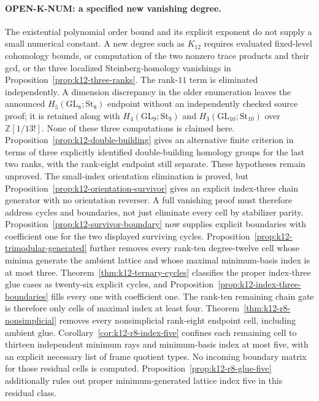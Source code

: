 \documentclass[11pt,a4paper]{article}
\theoremstyle{definition}
\begin{document}
\paragraph{OPEN-K-NUM: a specified new vanishing degree.}
The existential polynomial order bound and its explicit exponent do
not supply a small numerical constant. A new degree such as $K_{12}$
requires evaluated fixed-level cohomology bounds, or computation of the
two nonzero trace products and their gcd, or the three localized
Steinberg-homology vanishings in Proposition~\ref{prop:k12-three-ranks}.
The rank-$11$ term is eliminated independently. A dimension discrepancy
in the older enumeration leaves the announced $H_5(\mathrm{GL}_8;\mathrm{St}_8)$
endpoint without an independently checked source proof; it is retained
along with $H_4(\mathrm{GL}_9;\mathrm{St}_9)$ and
$H_3(\mathrm{GL}_{10};\mathrm{St}_{10})$ over $\mathbb Z[1/13!]$.
None of these three computations is claimed here.
Proposition~\ref{prop:k12-double-building} gives an alternative finite
criterion in terms of three explicitly identified double-building
homology groups for the last two ranks, with the rank-eight endpoint
still separate. These hypotheses remain unproved.
The small-index orientation elimination is proved, but
Proposition~\ref{prop:k12-orientation-survivor} gives an explicit
index-three chain generator with no orientation reverser. A full
vanishing proof must therefore address cycles and boundaries, not
just eliminate every cell by stabilizer parity.
Proposition~\ref{prop:k12-survivor-boundary} now supplies explicit
boundaries with coefficient one for the two displayed surviving
cycles. Proposition~\ref{prop:k12-trimodular-generated} further removes
every rank-ten degree-twelve cell whose minima generate the ambient
lattice and whose maximal minimum-basis index is at most three.
Theorem~\ref{thm:k12-ternary-cycles} classifies the proper index-three
glue cases as twenty-six explicit cycles, and
Proposition~\ref{prop:k12-index-three-boundaries} fills every one
with coefficient one. The rank-ten remaining chain gate is therefore
only cells of maximal index at least four.
Theorem~\ref{thm:k12-r8-nonsimplicial} removes every nonsimplicial
rank-eight endpoint cell, including ambient glue.
Corollary~\ref{cor:k12-r8-index-five} confines each remaining cell
to thirteen independent minimum rays and minimum-basis index at
most five, with an explicit necessary list of frame quotient types.
No incoming boundary matrix for those residual cells is computed.
Proposition~\ref{prop:k12-r8-glue-five} additionally rules out
proper minimum-generated lattice index five in this residual class.
\end{document}
